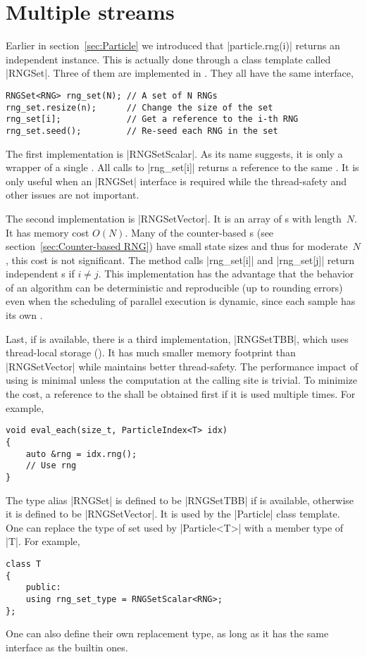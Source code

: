 \section{Multiple \texorpdfstring{\rng}{RNG} streams}
\label{sec:Multiple RNG streams}

Earlier in section~\ref{sec:Particle} we introduced that |particle.rng(i)|
returns an independent \rng instance. This is actually done through a class
template called |RNGSet|. Three of them are implemented in \mckl. They all have
the same interface,
\begin{verbatim}
RNGSet<RNG> rng_set(N); // A set of N RNGs
rng_set.resize(n);      // Change the size of the set
rng_set[i];             // Get a reference to the i-th RNG
rng_set.seed();         // Re-seed each RNG in the set
\end{verbatim}
The first implementation is |RNGSetScalar|. As its name suggests, it is only a
wrapper of a single \rng. All calls to |rng_set[i]| returns a reference to the
same \rng. It is only useful when an |RNGSet| interface is required while the
thread-safety and other issues are not important.

The second implementation is |RNGSetVector|. It is an array of \rng{}s with
length~$N$. It has memory cost $O(N)$. Many of the counter-based \rng{}s (see
section~\ref{sec:Counter-based RNG}) have small state sizes and thus for
moderate~$N$, this cost is not significant. The method calls |rng_set[i]| and
|rng_set[j]| return independent \rng{}s if $i \ne j$. This implementation has
the advantage that the behavior of an algorithm can be deterministic and
reproducible (up to rounding errors) even when the scheduling of parallel
execution is dynamic, since each sample has its own \rng.

Last, if \tbb is available, there is a third implementation, |RNGSetTBB|, which
uses thread-local storage (\tls). It has much smaller memory footprint than
|RNGSetVector| while maintains better thread-safety. The performance impact of
using \tls is minimal unless the computation at the calling site is trivial. To
minimize the \tls cost, a reference to the \rng shall be obtained first if it
is used multiple times. For example,
\begin{verbatim}
void eval_each(size_t, ParticleIndex<T> idx)
{
    auto &rng = idx.rng();
    // Use rng
}
\end{verbatim}

The type alias |RNGSet| is defined to be |RNGSetTBB| if \tbb is available,
otherwise it is defined to be |RNGSetVector|. It is used by the |Particle|
class template. One can replace the type of \rng set used by |Particle<T>| with
a member type of |T|. For example,
\begin{verbatim}
class T
{
    public:
    using rng_set_type = RNGSetScalar<RNG>;
};
\end{verbatim}
One can also define their own replacement type, as long as it has the same
interface as the builtin ones.

